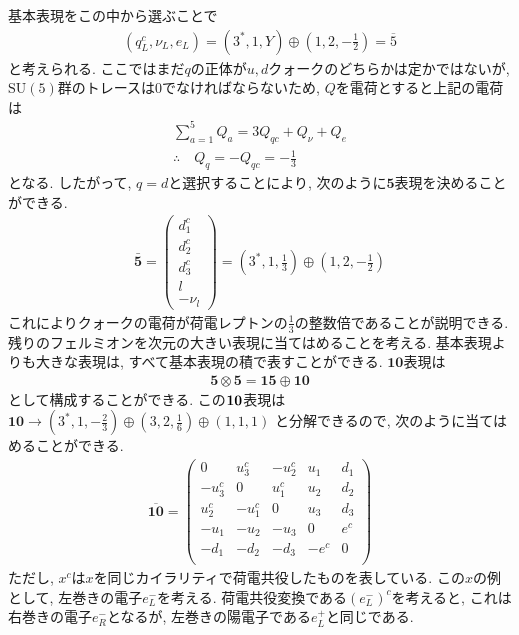 基本表現をこの中から選ぶことで
\begin{align}
  (q_L^c, \nu_L, e_L) = (3^*, 1, Y)\oplus\left(1,2,-\frac{1}{2}\right) = \overline{5}
\end{align}
と考えられる.
ここではまだ$q$の正体が$u, d$クォークのどちらかは定かではないが, $\mathrm{SU}(5)$群のトレースは0でなければならないため, $Q$を電荷とすると上記の電荷は
\begin{align}
  \sum_{a=1}^5 Q_a = 3Q_{qc}+Q_\nu + Q_e\nonumber\\
  \therefore\quad Q_q = -Q_{qc} = -\frac{1}{3}
\end{align}
となる.
したがって, $q=d$と選択することにより, 次のように$\bm{5}$表現を決めることができる.
\begin{align}
 \bar{\bm{5}}=\begin{pmatrix}
    d_1 ^c \\
    d_2 ^c \\
    d_3 ^c \\
    l      \\
    -\nu_l
  \end{pmatrix}=\left({3}^*,1,\frac{1}{3}\right)\oplus \left(1,2,-\frac{1}{2}\right)\label{GUT-5rep}
\end{align}
これによりクォークの電荷が荷電レプトンの$\frac{1}{3}$の整数倍であることが説明できる.
残りのフェルミオンを次元の大きい表現に当てはめることを考える.
基本表現よりも大きな表現は, すべて基本表現の積で表すことができる.
${\bm{10}}$表現は
\begin{align}
  \bm{5}\otimes\bm{5} = \bm{15}\oplus\bm{10}\nonumber
\end{align}
として構成することができる.
この$\bf{10}$表現は$\bm{10}\rightarrow (3^*,1,-\frac{2}{3})\oplus(3,2,\frac{1}{6})\oplus(1,1,1)$
と分解できるので, 次のように当てはめることができる.
\begin{align}
    \overline{\bm{10}}= \begin{pmatrix}
         0 &  u_3^c & -u_2^c & u_1 & d_1 \\
    -u_3^c &      0 &  u_1^c & u_2 & d_2 \\
     u_2^c & -u_1^c &      0 & u_3 & d_3 \\
    -u_1   &   -u_2 &   -u_3 &   0 & e^c \\
      -d_1 &   -d_2 &   -d_3 &-e^c &   0 \\
    \end{pmatrix}\label{GUT-10rep}
\end{align}
ただし, $x^c$は$x$を同じカイラリティで荷電共役したものを表している.
この$x$の例として, 左巻きの電子$e^-_L$を考える.
荷電共役変換である$(e^-_L)^c$を考えると, これは右巻きの電子$e_R^-$となるが, 左巻きの陽電子である$e_L^+$と同じである.




